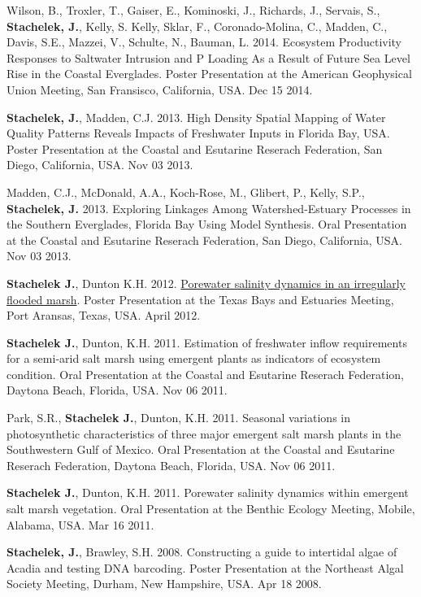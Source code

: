 \documentclass[11pt]{article}
\makeatletter
\newlength{\bibhang}
\newlength{\bibsep}
 {\@listi \global\bibsep\itemsep \global\advance\bibsep by\parsep}
\newenvironment{bibenum*}
  {\renewcommand\labelenumi{[\theenumi]}%
   \etaremune[
     topsep=0pt,
     itemsep=\bibsep,
     parsep=0pt,partopsep=0pt,
     itemindent=-\bibhang,
     leftmargin={\bibhang+\widthof{[999]}}]}
  {\endetaremune}
\makeatother
\begin{document}
\begin{bibenum*}
%   
    \item Wilson, B., Troxler, T., Gaiser, E., Kominoski, J., Richards, J., Servais, S., \textbf{Stachelek, J.}, Kelly, S. Kelly, Sklar, F., Coronado-Molina, C., Madden, C., Davis, S.E., Mazzei, V., Schulte, N., Bauman, L. 2014. Ecosystem Productivity Responses to Saltwater Intrusion and P Loading As a Result of Future Sea Level Rise in the Coastal Everglades. Poster Presentation at the American Geophysical Union Meeting, San Fransisco, California, USA. Dec 15 2014.
   
    \item \textbf{Stachelek, J.}, Madden, C.J. 2013. High Density Spatial Mapping of Water Quality Patterns Reveals Impacts of Freshwater Inputs in Florida Bay, USA. Poster Presentation at the Coastal and Esutarine Reserach Federation, San Diego, California, USA. Nov 03 2013.
   
    \item Madden, C.J., McDonald, A.A., Koch-Rose, M., Glibert, P., Kelly, S.P., \textbf{Stachelek, J.} 2013. Exploring Linkages Among Watershed-Estuary Processes in the Southern Everglades, Florida Bay Using Model Synthesis. Oral Presentation at the Coastal and Esutarine Reserach Federation, San Diego, California, USA. Nov 03 2013.
   
   \item \textbf{Stachelek J.}, Dunton K.H. 2012. \href{http://doi.org/10.6084/m9.figshare.6614960.v1}{Porewater salinity dynamics in an irregularly flooded marsh}. Poster Presentation at the Texas Bays and Estuaries Meeting, Port Aransas, Texas, USA. April 2012.
   
    \item \textbf{Stachelek J.}, Dunton, K.H. 2011. Estimation of freshwater inflow requirements for a semi-arid salt marsh using emergent plants as indicators of ecosystem condition. Oral Presentation at the Coastal and Esutarine Reserach Federation, Daytona Beach, Florida, USA. Nov 06 2011.

    \item Park, S.R., \textbf{Stachelek J.}, Dunton, K.H. 2011. Seasonal variations in photosynthetic characteristics of three major emergent salt marsh plants in the Southwestern Gulf of Mexico. Oral Presentation at the Coastal and Esutarine Reserach Federation, Daytona Beach, Florida, USA. Nov 06 2011.
 
    \item \textbf{Stachelek J.}, Dunton, K.H. 2011. Porewater salinity dynamics within emergent salt marsh vegetation. Oral Presentation at the Benthic Ecology Meeting, Mobile, Alabama, USA. Mar 16 2011.
    
    \item \textbf{Stachelek, J.}, Brawley, S.H. 2008. Constructing a guide to intertidal algae of Acadia and testing DNA barcoding. Poster Presentation at the Northeast Algal Society Meeting, Durham, New Hampshire, USA. Apr 18 2008.

\end{bibenum*}
\end{document}
